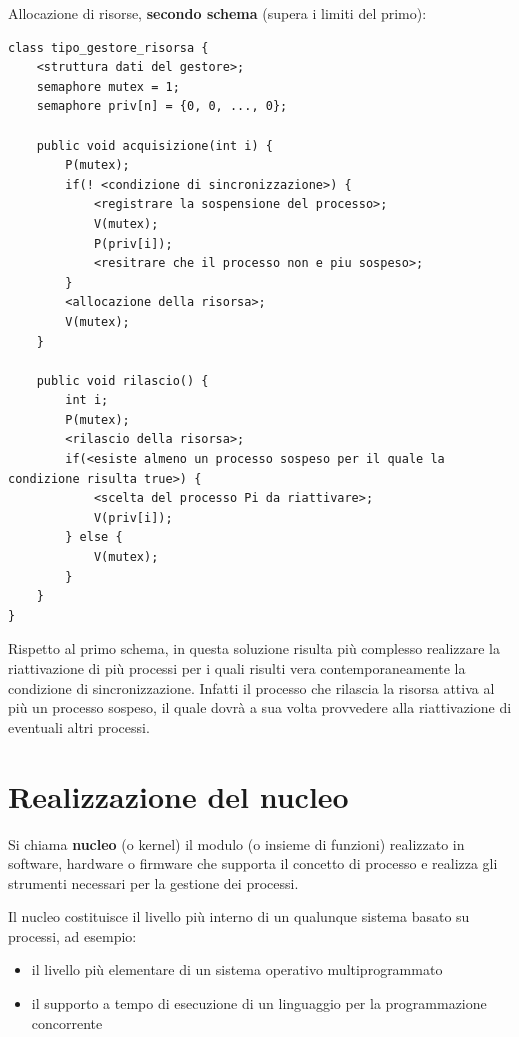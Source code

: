 \documentclass{article}
\begin{document}
\vspace{3mm}
Allocazione di risorse, \textbf{secondo schema} (supera i limiti del primo):

\begin{lstlisting}
class tipo_gestore_risorsa {
    <struttura dati del gestore>;
    semaphore mutex = 1;
    semaphore priv[n] = {0, 0, ..., 0};

    public void acquisizione(int i) {
        P(mutex);
        if(! <condizione di sincronizzazione>) {
            <registrare la sospensione del processo>;
            V(mutex);
            P(priv[i]);
            <resitrare che il processo non e piu sospeso>;
        }
        <allocazione della risorsa>;
        V(mutex);
    }

    public void rilascio() {
        int i;
        P(mutex);
        <rilascio della risorsa>;
        if(<esiste almeno un processo sospeso per il quale la condizione risulta true>) {
            <scelta del processo Pi da riattivare>;
            V(priv[i]);
        } else {
            V(mutex);
        }
    }
}
\end{lstlisting}

\vspace{3mm}
Rispetto al primo schema, in questa soluzione risulta più complesso realizzare la riattivazione di più processi per i quali risulti vera contemporaneamente la
condizione di sincronizzazione. Infatti il processo che rilascia la risorsa attiva al più un processo sospeso, il quale dovrà a sua volta provvedere alla riattivazione
di eventuali altri processi.

\section{Realizzazione del nucleo}

Si chiama \textbf{nucleo} (o kernel) il modulo (o insieme di funzioni) realizzato in software, hardware o firmware che supporta il concetto di processo e realizza
gli strumenti necessari per la gestione dei processi.

\vspace{3mm}
Il nucleo costituisce il livello più interno di un qualunque sistema basato su processi, ad esempio:
\begin{itemize}
    \item il livello più elementare di un sistema operativo multiprogrammato
    \item il supporto a tempo di esecuzione di un linguaggio per la programmazione concorrente
\end{itemize}
\end{document}
